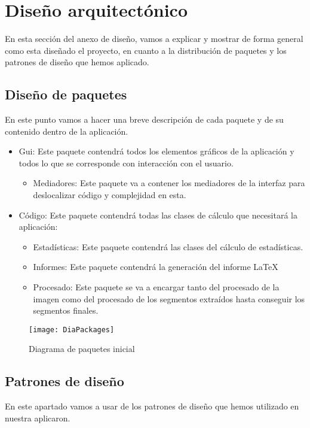 \section{Diseño arquitectónico}

En esta sección del anexo de diseño, vamos a explicar y mostrar de forma general como esta diseñado el proyecto, en cuanto a la distribución de paquetes y los patrones de diseño que hemos aplicado.

\subsection{Diseño de paquetes}

En este punto vamos a hacer una breve descripción de cada paquete y de su contenido dentro de la aplicación.

\begin{itemize}
\item Gui:
Este paquete contendrá todos los elementos gráficos de la aplicación y todos lo que se corresponde con interacción con el usuario.
	\begin{itemize}
	\item Mediadores:
	Este paquete va a contener los mediadores de la interfaz para deslocalizar código y complejidad en esta.
	\end{itemize}
\item Código: Este paquete contendrá todas las clases de cálculo que necesitará la aplicación:
	\begin{itemize}
	\item Estadísticas:
	Este paquete contendrá las clases del cálculo de estadísticas.
	\item Informes:
	Este paquete contendrá la generación del informe \LaTeX
	\item Procesado:
	Este paquete se va a encargar tanto del procesado de la imagen 			como del procesado de los segmentos extraídos hasta conseguir los 		segmentos finales.
	\end{itemize}
\end{itemize}

\begin{figure}[h]
	\centering
	\texttt{[image: DiaPackages]}
	\caption{Diagrama de paquetes inicial}
	\label{fig:C.1.2}
\end{figure}


\subsection{Patrones de diseño}
En este apartado vamos a usar de los patrones de diseño que hemos utilizado en nuestra aplicaron.

